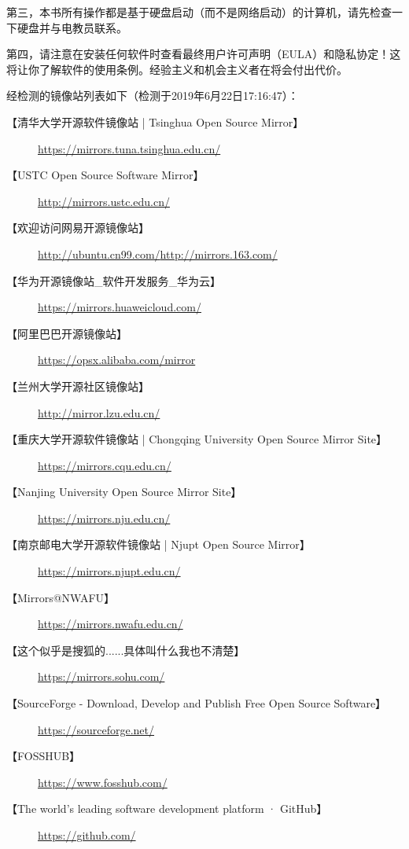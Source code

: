 第三，本书所有操作都是基于硬盘启动（而不是网络启动）的计算机，请先检查一下硬盘并与电教员联系。\par 
第四，请注意在安装任何软件时查看最终用户许可声明（EULA）和隐私协定！这将让你了解软件的使用条例。经验主义和机会主义者在将会付出代价。
\begin{center}\Large \bf {\color{red}{本书将不会提供任何有关破解专有软件的方法\\或进行反向工程、反向汇编、反向编译的知识。}}\normalall\end{center}
经检测的镜像站列表如下（检测于2019年6月22日17:16:47）：
\begin{description}
	\item [【清华大学开源软件镜像站 | Tsinghua Open Source Mirror】]\url{https://mirrors.tuna.tsinghua.edu.cn/}
	\item [【USTC Open Source Software Mirror】]\url{http://mirrors.ustc.edu.cn/}
	\item [【欢迎访问网易开源镜像站】]\url{http://ubuntu.cn99.com/}\url{http://mirrors.163.com/}
	\item [【华为开源镜像站\_软件开发服务\_华为云】]\url{https://mirrors.huaweicloud.com/}
	\item [【阿里巴巴开源镜像站】]\url{https://opsx.alibaba.com/mirror}
	\item [【兰州大学开源社区镜像站】]\url{http://mirror.lzu.edu.cn/}
	\item [【重庆大学开源软件镜像站 | Chongqing University Open Source Mirror Site】] \url{https://mirrors.cqu.edu.cn/}
	\item [【Nanjing University Open Source Mirror Site】] \url{https://mirrors.nju.edu.cn/}
	\item [【南京邮电大学开源软件镜像站 | Njupt Open Source Mirror】]\url{https://mirrors.njupt.edu.cn/}
	\item [【Mirrors@NWAFU】]\url{https://mirrors.nwafu.edu.cn/}
	\item [【这个似乎是搜狐的......具体叫什么我也不清楚】]\url{https://mirrors.sohu.com/}
	\item [【SourceForge - Download, Develop and Publish Free Open Source Software】] \url{https://sourceforge.net/}
	\item [【FOSSHUB】] \url{https://www.fosshub.com/}
	\item [【The world’s leading software development platform · GitHub】] \url{https://github.com/}
\end{description}
